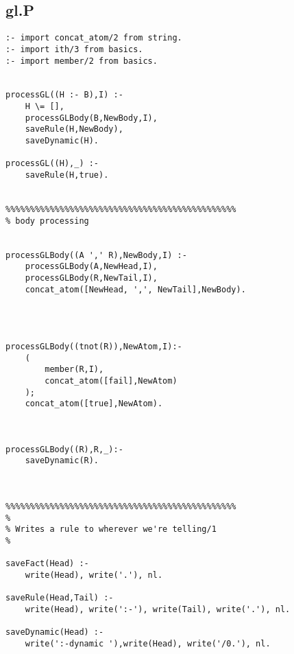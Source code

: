 \subsection{gl.P}
\begin{verbatim}
:- import concat_atom/2 from string.
:- import ith/3 from basics.
:- import member/2 from basics.


processGL((H :- B),I) :-
	H \= [],
	processGLBody(B,NewBody,I),
	saveRule(H,NewBody),
	saveDynamic(H).

processGL((H),_) :-
	saveRule(H,true).


%%%%%%%%%%%%%%%%%%%%%%%%%%%%%%%%%%%%%%%%%%%%%%%
% body processing


processGLBody((A ',' R),NewBody,I) :- 
	processGLBody(A,NewHead,I),
	processGLBody(R,NewTail,I),
	concat_atom([NewHead, ',', NewTail],NewBody).




processGLBody((tnot(R)),NewAtom,I):- 
	(
		member(R,I),
		concat_atom([fail],NewAtom)
	);
	concat_atom([true],NewAtom).



processGLBody((R),R,_):-
	saveDynamic(R).
	


%%%%%%%%%%%%%%%%%%%%%%%%%%%%%%%%%%%%%%%%%%%%%%%
%
% Writes a rule to wherever we're telling/1
%

saveFact(Head) :-
	write(Head), write('.'), nl.

saveRule(Head,Tail) :-
	write(Head), write(':-'), write(Tail), write('.'), nl.

saveDynamic(Head) :-
	write(':-dynamic '),write(Head), write('/0.'), nl.

\end{verbatim}